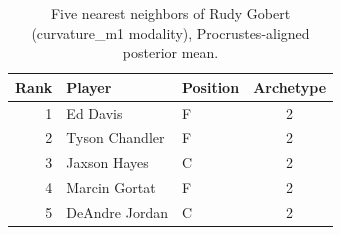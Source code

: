 \begin{table}[htbp]
  \centering\small
  \begin{tabular}{rllc}
    \toprule
    Rank & Player & Position & Archetype \\
    \midrule
    1 & Ed Davis & F & 2 \\
    2 & Tyson Chandler & F & 2 \\
    3 & Jaxson Hayes & C & 2 \\
    4 & Marcin Gortat & F & 2 \\
    5 & DeAndre Jordan & C & 2 \\
    \bottomrule
  \end{tabular}
  \caption{Five nearest neighbors of Rudy Gobert (curvature_m1 modality), Procrustes-aligned posterior mean.}
  \label{tab:Rudy_Gobert_neighbors_curvature_m1}
\end{table}

